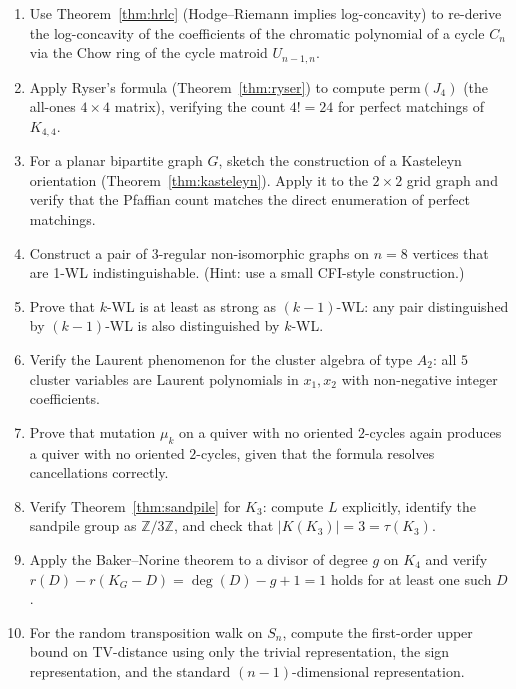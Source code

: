 \begin{enumerate}[resume]
\item Use Theorem~\ref{thm:hrlc} (Hodge--Riemann implies log-concavity) to
re-derive the log-concavity of the coefficients of the chromatic
polynomial of a cycle $C_n$ via the Chow ring of the cycle matroid
$U_{n - 1, n}$.

\item Apply Ryser's formula (Theorem~\ref{thm:ryser}) to compute
$\mathrm{perm}(J_4)$ (the all-ones $4 \times 4$ matrix), verifying
the count $4! = 24$ for perfect matchings of $K_{4,4}$.

\item For a planar bipartite graph $G$, sketch the construction of a
Kasteleyn orientation (Theorem~\ref{thm:kasteleyn}). Apply it to the
$2 \times 2$ grid graph and verify that the Pfaffian count matches
the direct enumeration of perfect matchings.

\item Construct a pair of $3$-regular non-isomorphic graphs on $n = 8$
vertices that are 1-WL indistinguishable. (Hint: use a small
CFI-style construction.)

\item Prove that $k$-WL is at least as strong as $(k - 1)$-WL: any pair
distinguished by $(k-1)$-WL is also distinguished by $k$-WL.

\item Verify the Laurent phenomenon for the cluster algebra of type $A_2$:
all $5$ cluster variables are Laurent polynomials in $x_1, x_2$ with
non-negative integer coefficients.

\item Prove that mutation $\mu_k$ on a quiver with no oriented $2$-cycles
again produces a quiver with no oriented $2$-cycles, given that the
formula resolves cancellations correctly.

\item Verify Theorem~\ref{thm:sandpile} for $K_3$: compute $L$ explicitly,
identify the sandpile group as $\mathbb Z / 3 \mathbb Z$, and check
that $|K(K_3)| = 3 = \tau(K_3)$.

\item Apply the Baker--Norine theorem to a divisor of degree $g$ on $K_4$
and verify $r(D) - r(K_G - D) = \deg(D) - g + 1 = 1$ holds for at
least one such $D$.

\item For the random transposition walk on $S_n$, compute the first-order
upper bound on TV-distance using only the trivial representation, the
sign representation, and the standard $(n-1)$-dimensional
representation.


\end{enumerate}
